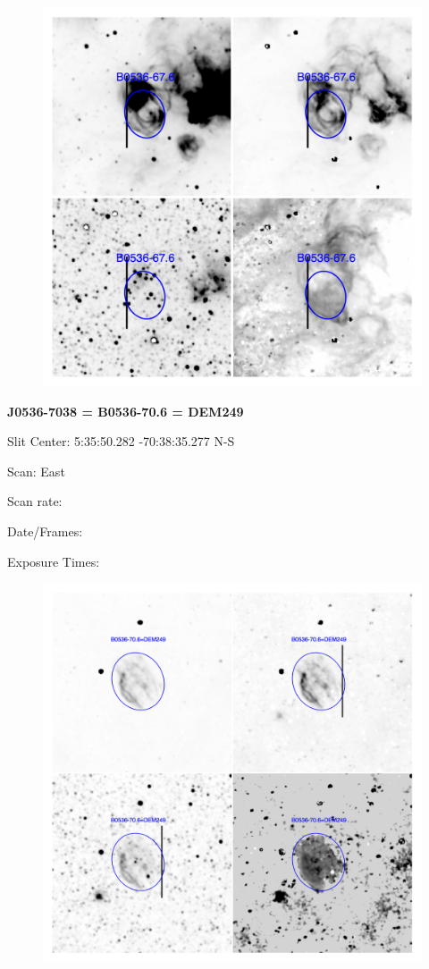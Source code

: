 \documentclass[11pt]{article}
\begin{document}
\begin{figure}
\includegraphics[width=12.5cm]{snapshots/B0536-676.png}
\end{figure}


\newpage
{\bf J0536-7038 = B0536-70.6 = DEM249}  
 
Slit Center:   5:35:50.282   -70:38:35.277 N-S

Scan:  East

Scan rate:  

Date/Frames:

Exposure Times:  

\begin{figure}
\includegraphics[width=11.cm]{snapshots/B0536-706.png}
\end{figure}
\end{document}
